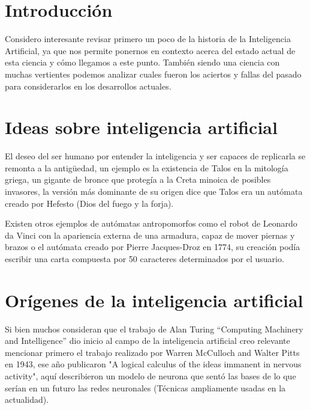 \documentclass[11pt,fleqn]{book} %
\begin{document}
\section{Introducción}

Considero interesante revisar primero un poco de la historia de la Inteligencia Artificial, ya que nos permite ponernos en contexto acerca del estado actual de esta ciencia y cómo llegamos a este punto. También siendo una ciencia con muchas vertientes podemos analizar cuales fueron los aciertos y fallas del pasado para considerarlos en los desarrollos actuales.

\section{Ideas sobre inteligencia artificial}

El deseo del ser humano por entender la inteligencia y ser capaces de replicarla se remonta a la antigüedad, un ejemplo es la existencia de Talos en la mitología griega, un gigante de bronce que protegía a la Creta minoica de posibles invasores, la versión más dominante de su origen dice que Talos era un autómata creado por Hefesto (Dios del fuego y la forja).

Existen otros ejemplos de autómatas antropomorfos como el robot de Leonardo da Vinci con la apariencia externa de una armadura, capaz de mover piernas y brazos o el autómata creado por Pierre Jacques-Droz en 1774, su creación podía escribir una carta compuesta por 50 caracteres determinados por el usuario.


\section{Orígenes de la inteligencia artificial}

Si bien muchos consideran que el trabajo de Alan Turing “Computing Machinery and Intelligence” \cite{turing_compmach} dio inicio al campo de la inteligencia artificial creo relevante mencionar primero el trabajo realizado por Warren McCulloch and Walter Pitts en 1943, ese año publicaron "A logical calculus of the ideas immanent in nervous activity", aquí describieron un modelo de neurona que sentó las bases de lo que serían en un futuro las redes neuronales (Técnicas ampliamente usadas en la actualidad).
\end{document}
